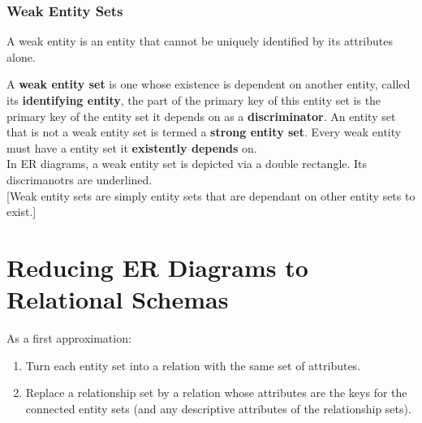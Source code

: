 \documentclass[11pt,a4paper,twocolumn]{book}
\begin{document}
\subsubsection{Weak Entity Sets}

A weak entity is an entity that cannot be uniquely identified by its attributes alone.


A \textbf{weak entity set} is one whose existence is dependent on another entity, called its \textbf{identifying entity}, the part of the primary key of this entity set is the primary key of the entity set it depends on as a \textbf{discriminator}. An entity set that is not a weak entity set is termed a \textbf{strong entity set}. Every weak entity must have a entity set it \textbf{existently depends} on.\\

In ER diagrams, a weak entity set is depicted via a double rectangle. Its discrimanotrs are underlined.\\

[Weak entity sets are simply entity sets that are dependant on other entity sets to exist.]

\section{Reducing ER Diagrams to Relational Schemas}

As a first approximation:

\begin{enumerate}
\item Turn each entity set into a relation with the same set of attributes.
\item Replace a relationship set by a relation whose attributes are the keys for the connected entity sets (and any descriptive attributes of the relationship sets).
\end{enumerate}
\end{document}
